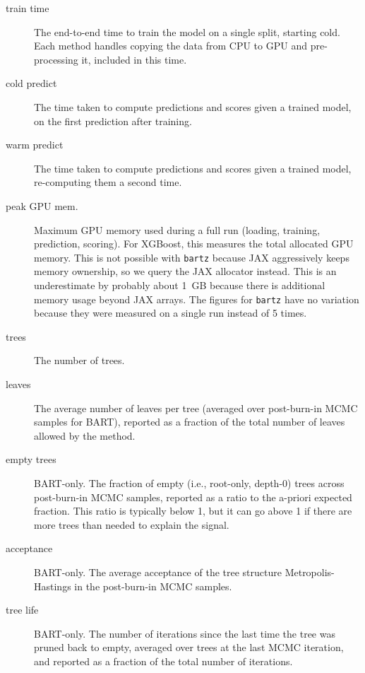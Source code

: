 \documentclass{article}
\begin{document}
\begin{description}
	\item[train time] The end-to-end time to train the model on a single
		split, starting cold. Each method handles copying the data from
		CPU to GPU and pre-processing it, included in this time.
	
	\item[cold predict] The time taken to compute predictions and scores given a
		trained model, on the first prediction after training.

	\item[warm predict] The time taken to compute predictions and scores given a
		trained model, re-computing them a second time.

	\item[peak GPU mem.] Maximum GPU memory used during a full run
		(loading, training, prediction, scoring). For XGBoost, this
		measures the total allocated GPU memory. This is not possible
		with \texttt{bartz} because JAX aggressively keeps memory ownership,
		so we query the JAX allocator instead.
		This is an underestimate by probably about
		\SI{1}{GB} because there is additional memory usage beyond JAX
		arrays. The figures for \texttt{bartz} have no variation because
		they were measured on a single run instead of 5 times.

	\item[trees] The number of trees.

	\item[leaves] The average number of leaves per tree (averaged over
		post-burn-in MCMC samples for BART), reported as a fraction of
		the total number of leaves allowed by the method.

	\item[empty trees] BART-only. The fraction of empty (i.e., root-only,
		depth-0) trees across post-burn-in MCMC samples, reported as a
		ratio to the a-priori expected fraction. This ratio is
		typically below 1, but it can go above 1 if there are more
		trees than needed to explain the signal.
	
	\item[acceptance] BART-only. The average acceptance of the tree
		structure Metropolis-Hastings in the post-burn-in MCMC samples.

	\item[tree life] BART-only. The number of iterations since the last
		time the tree was pruned back to empty, averaged over trees at
		the last MCMC iteration, and reported as a fraction of the
		total number of iterations.

\end{description}
\end{document}
